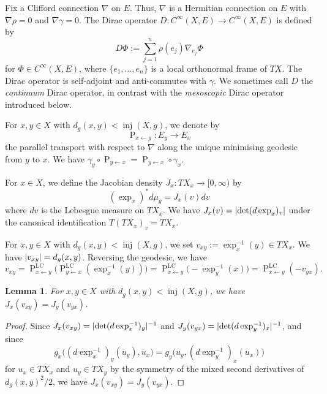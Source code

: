 \documentclass[a4paper,oneside,12pt]{amsart}
\theoremstyle{plain}
\newtheorem{lemma}[theorem]{Lemma}
\theoremstyle{definition}
\theoremstyle{remark}
\DeclarePairedDelimiter{\abs}{\lvert}{\rvert}
\DeclareMathOperator{\injectivityradius}{inj}
\newcommand{\dvol}{d\mu}
\newcommand{\paralleltransport}[2]{\operatorname{P}_{#2 \gets #1}}
\newcommand{\paralleltransportLC}[2]{\paralleltransport{#1}{#2}^{\mathrm{LC}}}
\newcommand{\cliffordmultiplication}{\rho}
\begin{document}
Fix a Clifford connection $\nabla$ on $E$.
Thus, $\nabla$ is a Hermitian connection on $E$ with $\nabla \cliffordmultiplication = 0$ and $\nabla \gamma = 0$.
The Dirac operator $D \colon C^{\infty}(X,E) \to C^{\infty}(X,E)$ is defined by
\begin{equation}
  D \Phi := \sum_{j=1}^n \cliffordmultiplication(e_j) \nabla_{e_j} \Phi
\end{equation}
for $\Phi \in C^{\infty}(X,E)$, where $\{e_1, \dots, e_n\}$ is a local orthonormal frame of $TX$.
The Dirac operator is self-adjoint and anti-commutes with $\gamma$.
We sometimes call $D$ the \emph{continuum} Dirac operator, in contrast with the \emph{mesoscopic} Dirac operator introduced below.

For $x,y \in X$ with $d_g(x,y) < \injectivityradius(X,g)$, we denote by
\begin{equation}
  \paralleltransport{y}{x} \colon E_y \to E_x
\end{equation}
the parallel transport with respect to $\nabla$ along the unique minimising geodesic from $y$ to $x$.
We have $\gamma_y \circ \paralleltransport{x}{y} = \paralleltransport{x}{y} \circ \gamma_x$.

For $x \in X$, we define the Jacobian density $J_x \colon TX_x \to [0,\infty)$ by
\begin{equation}
  (\exp_x)^* \dvol_g = J_x(v) dv
\end{equation}
where $dv$ is the Lebesgue measure on $TX_x$.
We have $J_x(v) = \abs{\det (d\exp_x)_v}$ under the canonical identification $T(TX_x)_v = TX_x$.

For $x,y \in X$ with $d_g(x,y) < \injectivityradius(X,g)$, we set $v_{xy} := \exp_x^{-1}(y) \in TX_x$.
We have $\abs{v_{xy}} = d_g(x,y)$.
Reversing the geodesic, we have
  \begin{equation}\label{equation: reversing the geodesic}
    v_{xy} =\paralleltransportLC{y}{x}\big(\paralleltransportLC{x}{y}(\exp_x^{-1}(y))\big) = \paralleltransportLC{y}{x}\big(-\exp_y^{-1}(x)\big) = \paralleltransportLC{y}{x}(-v_{yx}).
  \end{equation}
\begin{lemma}\label{lemma: symmetry of Jacobian density}
  For $x,y \in X$ with $d_g(x,y) < \injectivityradius(X,g)$, we have $J_x(v_{xy}) = J_y(v_{yx})$.
\end{lemma}
\begin{proof}
  Since $J_x(v_{xy}) = \abs{\det (d \exp_x^{-1})_y}^{-1}$ and $J_y(v_{yx}) = \abs{\det (d \exp_y^{-1})_x}^{-1}$, and since
  \begin{equation}
    g_x \big( (d \exp_x^{-1})_y (u_y),u_x \big) = g_y \big( u_y, (d \exp_y^{-1})_x (u_x) \big)
  \end{equation}
  for $u_x \in TX_x$ and $u_y \in TX_y$ by the symmetry of the mixed second derivatives of $d_g(x,y)^2/2$, we have $J_x(v_{xy}) = J_y(v_{yx})$.
\end{proof}
\end{document}
